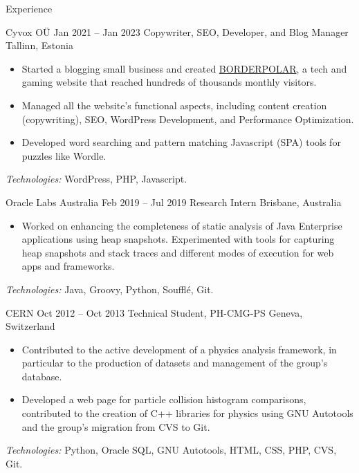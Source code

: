 \documentclass{resume}
\begin{document}
\begin{rSection}{Experience}
  \begin{rSubsection}
    {Cyvox O\"U}
    {Jan 2021 -- Jan 2023}
    {Copywriter, SEO, Developer, and Blog Manager}
    {Tallinn, Estonia}
    \begin{itemize}[label={\color{accent}\textbullet}, leftmargin=1.5em, topsep=2pt]
      \setlength\itemsep{-0.2em}
        \item Started a blogging small business and created \href{http://borderpolar.com}{BORDERPOLAR}, a tech and gaming website that reached hundreds of thousands monthly visitors.
        \item Managed all the website's functional aspects, including content creation (copywriting), SEO, WordPress Development, and Performance Optimization.
        \item Developed word searching and pattern matching Javascript (SPA) tools for puzzles like Wordle.
    \end{itemize}
    \footnotesize\textcolor{TechsColor}{\textit{Technologies:} WordPress, PHP, Javascript.}
  \end{rSubsection}

  \begin{rSubsection}
    {Oracle Labs Australia}
    {Feb 2019 -- Jul 2019}
    {Research Intern}
    {Brisbane, Australia}
    \begin{itemize}[label={\color{accent}\textbullet}, leftmargin=1.5em, topsep=2pt]
      \setlength\itemsep{-0.2em}
      \item Worked on enhancing the completeness of static analysis of Java Enterprise applications using heap snapshots. Experimented with tools for capturing heap snapshots and stack traces and different modes of execution for web apps and frameworks.
    \end{itemize}
    \footnotesize\textcolor{TechsColor}{\textit{Technologies:} Java, Groovy, Python, Souffl\'e, Git.}
  \end{rSubsection}

  \begin{rSubsection}
    {CERN}
    {Oct 2012 -- Oct 2013}
    {Technical Student, PH-CMG-PS}
    {Geneva, Switzerland}
    \begin{itemize}[label={\color{accent}\textbullet}, leftmargin=1.5em, topsep=2pt]
      \setlength\itemsep{-0.2em}
      \item Contributed to the active development of a physics analysis framework, in particular to the production of datasets and management of the group's database.
      \item Developed a web page for particle collision histogram comparisons, contributed to the creation of C++ libraries for physics using GNU Autotools and the group's migration from CVS to Git.
    \end{itemize}
    \footnotesize\textcolor{TechsColor}{\textit{Technologies:} Python, Oracle SQL, GNU Autotools, HTML, CSS, PHP, CVS, Git.}
  \end{rSubsection}
\end{rSection}
\end{document}
